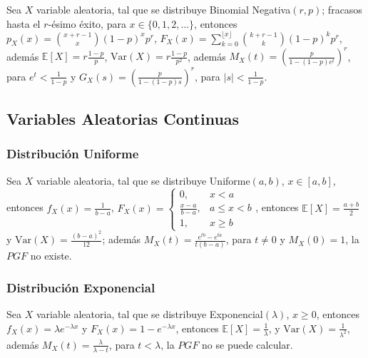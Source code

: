 \begin{Def} Sea $X$ variable aleatoria, tal que se distribuye Binomial Negativa$(r,p)$; fracasos hasta el $r$-\'esimo \'exito, para $x \in \{0,1,2,\dots\}$, entonces 
$ p_X(x) = \binom{x+r-1}{x}(1-p)^{x} p^{r}$, $F_X(x)= \sum_{k=0}^{\lfloor x \rfloor}\binom{k+r-1}{k}(1-p)^{k} p^{r}$, adem\'as $\mathbb{E}[X]=r\frac{1-p}{p}$, $\mathrm{Var}(X) = r\frac{1-p}{p^{2}}$, adem\' as $M_X(t)= \left(\frac{p}{1-(1-p)e^{t}}\right)^{r}$,  para $ e^{t}<\frac{1}{1-p}$ y $G_X(s) = \left(\frac{p}{1-(1-p)s}\right)^{r}$, para $|s|<\frac{1}{1-p}$.
\end{Def}


\subsection{Variables Aleatorias Continuas}

\subsubsection{Distribuci\'on Uniforme}

\begin{Def} Sea $X$ variable aleatoria, tal que se distribuye Uniforme$(a,b)$, $x \in [a,b]$,  entonces $f_X(x)= \frac{1}{b-a}$, $F_X(x)=\left\{
\begin{array}{cc}
0, & x<a \\
\frac{x-a}{b-a}, & a \le x < b \\
1, & x \ge b
\end{array}
\right. $, entonces $\mathbb{E}[X] = \frac{a+b}{2}$ y $\mathrm{Var}(X) = \frac{(b-a)^{2}}{12}$; adem\'as $M_X(t) = \frac{e^{tb}-e^{ta}}{t(b-a)}$,  para $t \neq 0$  y  $M_X(0)=1$,  la  $PGF$ no existe.
\end{Def}

\subsubsection{Distribuci\'on Exponencial}

\begin{Def} Sea $X$ variable aleatoria, tal que se distribuye Exponencial$(\lambda)$, $x \ge 0$, entonces $f_X(x)= \lambda e^{-\lambda x}$ y $F_X(x) = 1-e^{-\lambda x}$, entonces $\mathbb{E}[X] =\frac{1}{\lambda}$, y  $\mathrm{Var}(X) =\frac{1}{\lambda^{2}}$, adem\'as $M_X(t) = \frac{\lambda}{\lambda - t}$,  para $t<\lambda$,  la $PGF$ no se puede calcular.
\end{Def}

